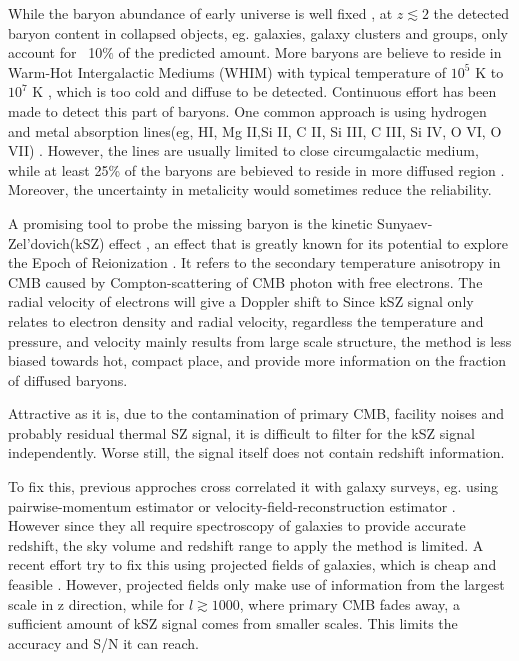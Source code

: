 While the baryon abundance of early universe is well fixed 
\cite{Cooke14,Fukugita98,Komatsu11,Hinshaw13}, 
at $z\lesssim 2$ the detected baryon content in collapsed
objects, eg. galaxies, galaxy clusters and groups, only account for ~10$\%$ of the predicted amount.
More baryons are believe to reside in Warm-Hot Intergalactic Mediums (WHIM) with typical temperature of $10^5$ K to $10^7$ K \cite{Pen1999}\cite{Soltan06}, which is too cold and diffuse to be detected.
Continuous effort has been made to detect this part of baryons. 
One common approach is using hydrogen and metal absorption lines(eg, HI, Mg II,Si II, C II, Si III, C III, Si IV, O VI, O VII) \cite{Fukugita04}\cite{Werk14}.
However, the lines are usually limited to close circumgalactic medium, while at least 25\% of the baryons are bebieved to reside in more diffused region \cite{Dave10}. Moreover, the uncertainty in metalicity would sometimes reduce the reliability.

A promising tool to probe the missing baryon is the kinetic Sunyaev-Zel'dovich(kSZ) effect \cite{Sunyaev72}\cite{Sunyaev80}, 
  an effect that is greatly known for its potential to explore the Epoch of Reionization \cite{Zhang04}\cite{McQuinn05}\cite{Zahn12}. 
It refers to the secondary temperature anisotropy in CMB caused by Compton-scattering of CMB photon with free electrons. 
The radial velocity of electrons will give a Doppler shift to 
Since kSZ signal only relates to electron density and radial velocity, 
regardless the temperature and pressure,  
and velocity mainly results from large scale structure, 
the method is less biased towards hot, compact place, 
and provide more information on the fraction of diffused baryons.

Attractive as it is, 
due to the contamination of primary CMB, facility noises and probably residual thermal SZ signal, 
it is difficult to filter for the kSZ signal independently. 
Worse still, the signal itself does not contain redshift information.

To fix this, previous approches cross correlated it with galaxy surveys, 
eg. using pairwise-momentum estimator \cite{Hand12} or velocity-field-reconstruction estimator \cite{Shao11}\cite{Li14}. 
However since they all require spectroscopy of galaxies to provide accurate redshift, the sky volume and redshift range to apply the method is limited. 
A recent effort try to fix this using projected fields of galaxies, which is cheap and feasible \cite{Hill16}. 
However, projected fields only make use of information from the largest scale in z direction, 
while for $l\gtrsim1000$, where primary CMB fades away, a sufficient amount of kSZ signal comes from smaller scales. 
This limits the accuracy and S/N it can reach.

